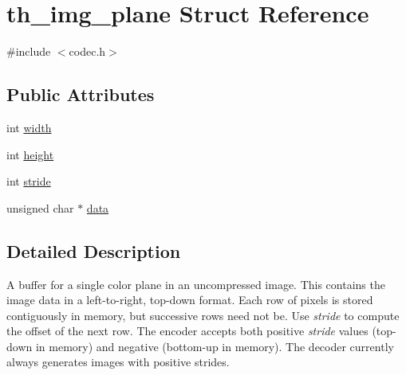 \hypertarget{structth__img__plane}{\section{th\+\_\+img\+\_\+plane Struct Reference}
\label{structth__img__plane}
}


{\ttfamily \#include $<$codec.\+h$>$}

\subsection*{Public Attributes}
\begin{DoxyCompactItemize}
\item 
int \hyperlink{structth__img__plane_a58cc297a99cd4594c3d30e56f2ed6b74}{width}
\item 
int \hyperlink{structth__img__plane_a21aea1367894468de489d529d7eaf44d}{height}
\item 
int \hyperlink{structth__img__plane_ab1100f071ffee3b37e07e3222f819bad}{stride}
\item 
unsigned char $\ast$ \hyperlink{structth__img__plane_af8133681516ce88b5a201c1b4b7e6ba2}{data}
\end{DoxyCompactItemize}


\subsection{Detailed Description}
A buffer for a single color plane in an uncompressed image. This contains the image data in a left-\/to-\/right, top-\/down format. Each row of pixels is stored contiguously in memory, but successive rows need not be. Use {\itshape stride} to compute the offset of the next row. The encoder accepts both positive {\itshape stride} values (top-\/down in memory) and negative (bottom-\/up in memory). The decoder currently always generates images with positive strides. 


